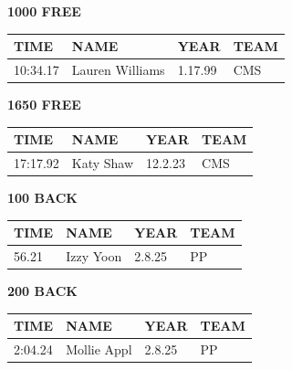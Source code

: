 \begin{table}[H]
\centering
\begin{minipage}[t]{0.48\textwidth}
\centering
\textbf{1000 FREE}\\[0.1cm]
\begin{tabular}{@{}p{1.8cm}p{2.8cm}p{1.2cm}p{1.4cm}@{}}
\hline
    \textbf{TIME} & \textbf{NAME} & \textbf{YEAR} & \textbf{TEAM} \\
\hline
    10:34.17 & Lauren Williams & 1.17.99 & CMS \\
\hline
\end{tabular}
\end{minipage}\hfill
\begin{minipage}[t]{0.48\textwidth}
\centering
\textbf{1650 FREE}\\[0.1cm]
\begin{tabular}{@{}p{1.8cm}p{2.8cm}p{1.2cm}p{1.4cm}@{}}
\hline
    \textbf{TIME} & \textbf{NAME} & \textbf{YEAR} & \textbf{TEAM} \\
\hline
    17:17.92 & Katy Shaw & 12.2.23 & CMS \\
\hline
\end{tabular}
\end{minipage}
\end{table}

\begin{table}[H]
\centering
\begin{minipage}[t]{0.48\textwidth}
\centering
\textbf{100 BACK}\\[0.1cm]
\begin{tabular}{@{}p{1.8cm}p{2.8cm}p{1.2cm}p{1.4cm}@{}}
\hline
    \textbf{TIME} & \textbf{NAME} & \textbf{YEAR} & \textbf{TEAM} \\
\hline
    56.21 & Izzy Yoon & 2.8.25 & PP \\
\hline
\end{tabular}
\end{minipage}\hfill
\begin{minipage}[t]{0.48\textwidth}
\centering
\textbf{200 BACK}\\[0.1cm]
\begin{tabular}{@{}p{1.8cm}p{2.8cm}p{1.2cm}p{1.4cm}@{}}
\hline
    \textbf{TIME} & \textbf{NAME} & \textbf{YEAR} & \textbf{TEAM} \\
\hline
    2:04.24 & Mollie Appl & 2.8.25 & PP \\
\hline
\end{tabular}
\end{minipage}
\end{table}

